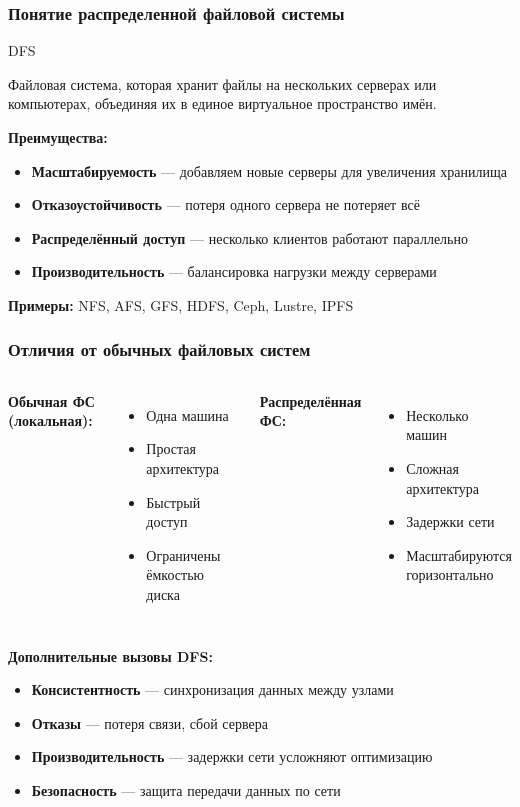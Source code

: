 \documentclass{beamer}
\newenvironment{definitionbox}[1][Определение]{%
  \begin{exampleblock}{#1}
}{%
  \end{exampleblock}
}
\begin{document}
\begin{frame}
\frametitle{Понятие распределенной файловой системы}

\begin{definitionbox}[DFS]
  Файловая система, которая хранит файлы на нескольких серверах или компьютерах, объединяя их в единое виртуальное пространство имён.
\end{definitionbox}

\textbf{Преимущества:}
\begin{itemize}
  \item \textbf{Масштабируемость} — добавляем новые серверы для увеличения хранилища
  \item \textbf{Отказоустойчивость} — потеря одного сервера не потеряет всё
  \item \textbf{Распределённый доступ} — несколько клиентов работают параллельно
  \item \textbf{Производительность} — балансировка нагрузки между серверами
\end{itemize}

\textbf{Примеры:} NFS, AFS, GFS, HDFS, Ceph, Lustre, IPFS

\end{frame}


\begin{frame}
\frametitle{Отличия от обычных файловых систем}

\begin{columns}
  \textbf{Обычная ФС (локальная):}
  \begin{itemize}
    \item Одна машина
    \item Простая архитектура
    \item Быстрый доступ
    \item Ограничены ёмкостью диска
  \end{itemize}

  \textbf{Распределённая ФС:}
  \begin{itemize}
    \item Несколько машин
    \item Сложная архитектура
    \item Задержки сети
    \item Масштабируются горизонтально
  \end{itemize}
\end{columns}

\vspace{0.3cm}

\textbf{Дополнительные вызовы DFS:}
\begin{itemize}
  \item \textbf{Консистентность} — синхронизация данных между узлами
  \item \textbf{Отказы} — потеря связи, сбой сервера
  \item \textbf{Производительность} — задержки сети усложняют оптимизацию
  \item \textbf{Безопасность} — защита передачи данных по сети
\end{itemize}

\end{frame}
\end{document}
